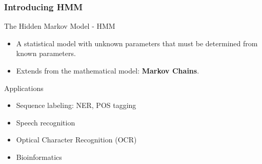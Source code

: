 \documentclass[13.5pt,aspecratio=169]{beamer}
\begin{document}
\begin{frame}
    \onehalfspacing
        \frametitle{Introducing HMM}
        
        \begin{block}{The Hidden Markov Model - HMM}
            \begin{itemize}
                \item A statistical model with unknown parameters that must be determined from known parameters.
                \item Extends from the mathematical model: \textbf{Markov Chains}.
            \end{itemize}
        \end{block}

        {
            \begin{block}{Applications}
                \begin{minipage}{0.45\textwidth}
                    \begin{itemize}
                        \item Sequence labeling: NER, POS tagging
                        \item Speech recognition
                    \end{itemize}
                \end{minipage}
                \begin{minipage}{0.45\textwidth}
                    \begin{itemize}
                        \item Optical Character Recognition (OCR)
                        \item Bioinformatics
                    \end{itemize}
                \end{minipage}
            \end{block}
        }
\end{frame}
    
\end{document}
